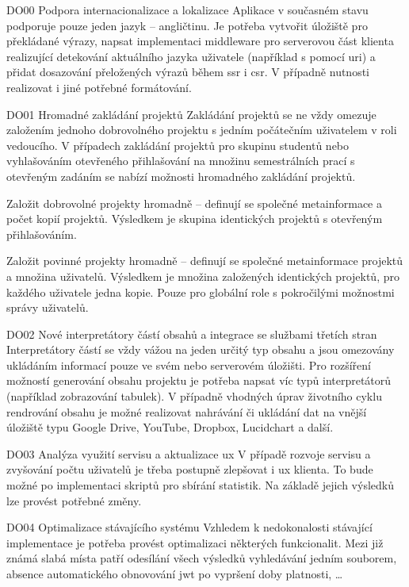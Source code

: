 \begin{dl}   

   \item[DO00 Podpora internacionalizace a lokalizace]
   Aplikace v současném stavu podporuje pouze jeden jazyk -- angličtinu. Je potřeba vytvořit úložiště pro překládané výrazy, napsat implementaci middleware pro serverovou část klienta realizující detekování aktuálního jazyka uživatele (například s pomocí \gls{uri}) a přidat dosazování přeložených výrazů během \gls{ssr} i \gls{csr}. V případně nutnosti realizovat i jiné potřebné formátování.
    
   \item[DO01 Hromadné zakládání projektů] 
   Zakládání projektů se ne vždy omezuje založením jednoho dobrovolného projektu s jedním počátečním uživatelem v roli vedoucího. V případech zakládání projektů pro skupinu studentů nebo vyhlašováním otevřeného přihlašování na množinu semestrálních prací s otevřeným zadáním se nabízí možnosti hromadného zakládání projektů.

   Založit dobrovolné projekty hromadně -- definují se společné metainformace a počet kopií projektů. Výsledkem je skupina identických projektů s otevřeným přihlašováním.

   Založit povinné projekty hromadně -- definují se společné metainformace projektů a množina uživatelů. Výsledkem je množina založených identických projektů, pro každého uživatele jedna kopie. Pouze pro globální role s pokročilými možnostmi správy uživatelů.

   \item[DO02 Nové interpretátory částí obsahů a integrace se službami třetích stran]
   Interpretátory částí se vždy vážou na jeden určitý typ obsahu a jsou omezovány ukládáním informací pouze ve svém nebo serverovém úložišti. Pro rozšíření možností generování obsahu projektu je potřeba napsat víc typů interpretátorů (například zobrazování tabulek). V případně vhodných úprav životního cyklu rendrování obsahu je možné realizovat nahrávání či ukládání dat na vnější úložiště typu Google Drive, YouTube, Dropbox, Lucidchart a další.

   \item[DO03 Analýza využití servisu a aktualizace \gls{ux}]
   V případě rozvoje servisu a zvyšování počtu uživatelů je třeba postupně zlepšovat i \gls{ux} klienta. To bude možné po implementaci skriptů pro sbírání statistik. Na základě jejich výsledků lze provést potřebné změny.
   
   \item[DO04 Optimalizace stávajícího systému]
   Vzhledem k nedokonalosti stávající implementace je potřeba provést optimalizaci některých funkcionalit. Mezi již známá slabá místa patří odesílání všech výsledků vyhledávání jedním souborem, absence automatického obnovování \gls{jwt} po vypršení doby platnosti, \dots
   

\end{dl}
